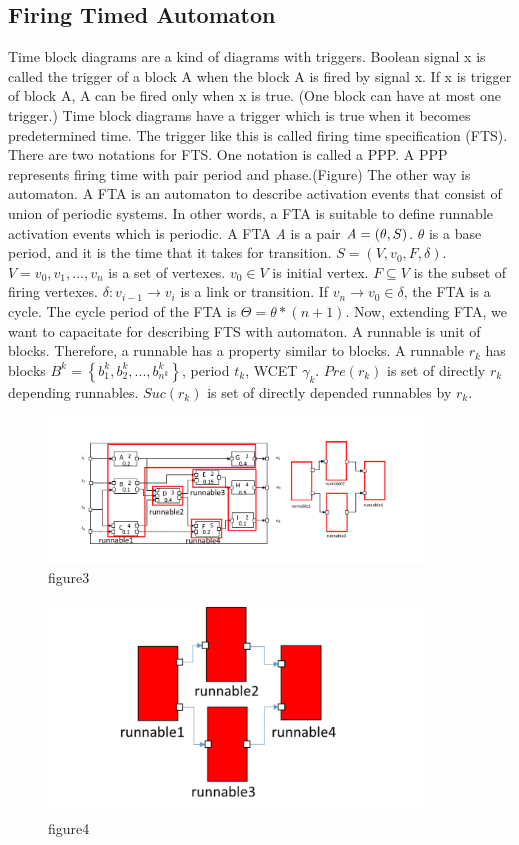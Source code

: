 \documentclass[conference,compsoc]{IEEEtran}
\begin{document}
\subsection{Firing Timed Automaton}
 Time block diagrams are a kind of diagrams with triggers.
Boolean signal x is called the trigger of a block A when the block A is fired by signal x. 
If x is trigger of block A, A can be fired only when x is true.
(One block can have at most one trigger.)
Time block diagrams have a trigger which is true when it becomes predetermined time.
The trigger like this is called firing time specification (FTS).
There are two notations for FTS.
One notation is called a PPP.
A PPP represents firing time with pair period and phase.(Figure)
The other way is  automaton.
A FTA is an automaton to describe activation events that consist of union of periodic systems.
In other words, a FTA is suitable to define runnable activation events which is periodic.
 A FTA {\it A} is a pair ${\it A} = (\theta,S)$. $\theta$ is a base period, and it is  the time that it takes for transition. 
$S = (V,v_0,F,\delta)$.
$V = {v_0,v_1,...,v_n}$ is a set of vertexes.
$v_0 \in V$ is initial vertex.
$F \subseteq V$ is the subset of firing vertexes.
$\delta : v_{i-1} \rightarrow v_{i}$ is a link or transition.
If $v_n \rightarrow v_0 \in \delta$, the FTA is a cycle.
The cycle period of the FTA is $\Theta = \theta * (n+1)$.
Now, extending FTA, we want to capacitate for describing FTS with automaton.
A runnable is unit of blocks.
Therefore, a runnable has a property similar to blocks.
A runnable $r_k$ has blocks $B^k = \left\{b_1^k,b_2^k,...,b_{n^k}^k\right\}$, period $t_k$, WCET $\gamma_k$.
$Pre(r_k)$ is set of directly $r_k$ depending runnables.
$Suc(r_k)$ is set of directly depended runnables by $r_k$.

\begin{figure}
	\centering
	\includegraphics[width=10cm,clip]{figure7.pdf}
	\caption{figure3}
	\label{fig3}
\end{figure}

\begin{figure}
	\centering
	\includegraphics[width=10cm,clip]{figure8.pdf}
	\caption{figure4}
	\label{fig4}
\end{figure}
\end{document}
